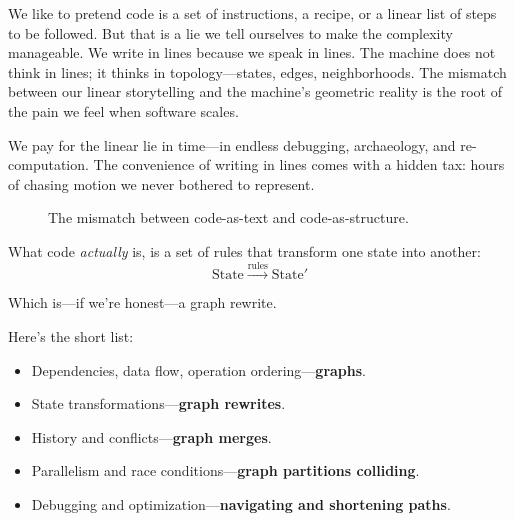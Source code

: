 We like to pretend code is a set of instructions, a recipe, or a linear list of steps to be followed. But that is a lie we tell ourselves to make the complexity manageable. We write in lines because we speak in lines. The machine does not think in lines; it thinks in topology—states, edges, neighborhoods. The mismatch between our linear storytelling and the machine's geometric reality is the root of the pain we feel when software scales.

We pay for the linear lie in time—in endless debugging, archaeology, and re-computation. The convenience of writing in lines comes with a hidden tax: hours of chasing motion we never bothered to represent.

\begin{figure}[h]
\centering
{}
\caption{The mismatch between code-as-text and code-as-structure.}
\label{fig:code-vs-structure}
\end{figure}

What code \textit{actually} is, is a set of rules that transform one state into another:
\[
\text{State} \xrightarrow{\text{rules}} \text{State}'
\]

Which is—if we’re honest—a graph rewrite.

Here’s the short list:
\begin{itemize}
    \item Dependencies, data flow, operation ordering—\textbf{graphs}.
    \item State transformations—\textbf{graph rewrites}.
    \item History and conflicts—\textbf{graph merges}.
    \item Parallelism and race conditions—\textbf{graph partitions colliding}.
    \item Debugging and optimization—\textbf{navigating and shortening paths}.
\end{itemize}

